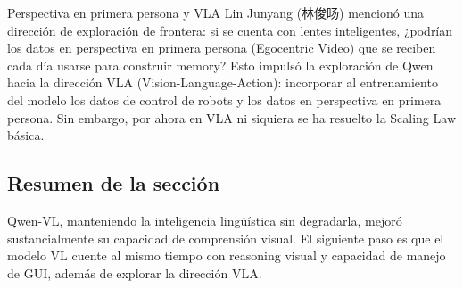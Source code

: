 \begin{knowledgebox}{Perspectiva en primera persona y VLA}
Lin Junyang (林俊旸) mencionó una dirección de exploración de frontera: si se cuenta con lentes inteligentes, ¿podrían los datos en perspectiva en primera persona (Egocentric Video) que se reciben cada día usarse para construir memory? Esto impulsó la exploración de Qwen hacia la dirección VLA (Vision-Language-Action): incorporar al entrenamiento del modelo los datos de control de robots y los datos en perspectiva en primera persona. Sin embargo, por ahora en VLA ni siquiera se ha resuelto la Scaling Law básica.
\end{knowledgebox}

\subsection{Resumen de la sección}

Qwen-VL, manteniendo la inteligencia lingüística sin degradarla, mejoró sustancialmente su capacidad de comprensión visual. El siguiente paso es que el modelo VL cuente al mismo tiempo con reasoning visual y capacidad de manejo de GUI, además de explorar la dirección VLA.
